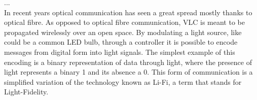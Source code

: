 ...\\
In recent years optical communication has seen a great spread mostly thanks to optical fibre.
As opposed to optical fibre communication, VLC is meant to be propagated wirelessly over an open space.
By modulating a light source, like could be a common LED bulb, through a controller it is possible to encode messages from digital form into light signals.
The simplest example of this encoding is a binary representation of data through light, where the presence of light represents a binary 1 and its absence a 0.
This form of communication is a simplified variation of the technology known as Li-Fi, a term that stands for Light-Fidelity.

